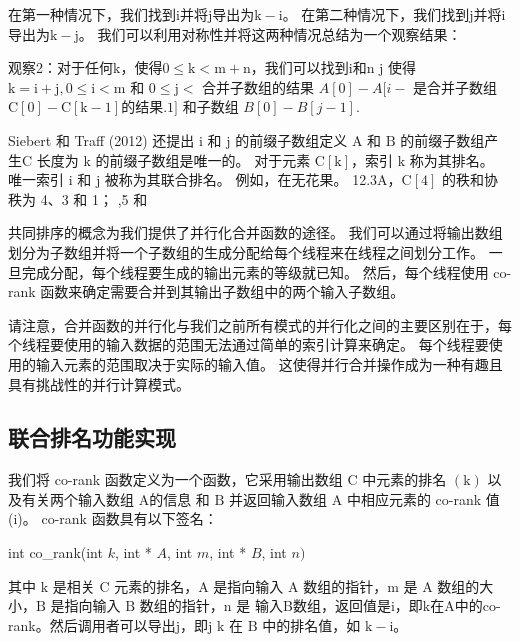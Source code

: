 在第一种情况下，我们找到$\mathrm{i}$并将$\mathrm{j}$导出为$\mathrm{k}-\mathrm{i}$。 在第二种情况下，我们找到$\mathrm{j}$并将$\mathrm{i}$导出为$\mathrm{k}-\mathrm{j}$。 我们可以利用对称性并将这两种情况总结为一个观察结果：

观察2：对于任何$\mathrm{k}$，使得$0 \leq \mathrm{k}<\mathrm{m}+\mathrm{n}$，我们可以找到$\mathrm{i}$和$\mathrm {n}$ {j} 使得 $\mathrm{k}=\mathrm{i}+\mathrm{j}, 0 \leq \mathrm{i}<\mathrm{m}$ 和 $0 \leq \mathrm {j}<$ 合并子数组的结果 $A[0]-A[i-$ 是合并子数组 $\mathrm{C}[0]-\mathrm{C}[\mathrm{k}-1 ]$的结果$.1]$ 和子数组 $B[0]-B[j-1]$.

Siebert 和 Traff (2012) 还提出 $\mathrm{i}$ 和 $\mathrm{j}$ 的前缀子数组定义 $\mathrm{A}$ 和 $\mathrm{B}$ 的前缀子数组产生$\mathrm{C}$ 长度为 $\mathrm{k}$ 的前缀子数组是唯一的。 对于元素 $\mathrm{C}[\mathrm{k}]$，索引 $\mathrm{k}$ 称为其排名。 唯一索引 $\mathrm{i}$ 和 $\mathrm{j}$ 被称为其联合排名。 例如，在无花果。 12.3A，$\mathrm{C}[4]$ 的秩和协秩为 4、3 和 1； ,5 和

共同排序的概念为我们提供了并行化合并函数的途径。 我们可以通过将输出数组划分为子数组并将一个子数组的生成分配给每个线程来在线程之间划分工作。 一旦完成分配，每个线程要生成的输出元素的等级就已知。 然后，每个线程使用 co-rank 函数来确定需要合并到其输出子数组中的两个输入子数组。

请注意，合并函数的并行化与我们之前所有模式的并行化之间的主要区别在于，每个线程要使用的输入数据的范围无法通过简单的索引计算来确定。 每个线程要使用的输入元素的范围取决于实际的输入值。 这使得并行合并操作成为一种有趣且具有挑战性的并行计算模式。

\subsection{联合排名功能实现}
我们将 co-rank 函数定义为一个函数，它采用输出数组 $\mathrm{C}$ 中元素的排名 $(\mathrm{k})$ 以及有关两个输入数组 $\mathrm{A} 的信息 $ 和 $\mathrm{B}$ 并返回输入数组 A 中相应元素的 co-rank 值 (i)。 co-rank 函数具有以下签名：

int co\_rank(int $k$, int * $A$, int $m$, int * $B$, int $n)$

其中 $\mathrm{k}$ 是相关 $\mathrm{C}$ 元素的排名，$\mathrm{A}$ 是指向输入 $\mathrm{A}$ 数组的指针，$\mathrm{ m}$ 是 $\mathrm{A}$ 数组的大小，$\mathrm{B}$ 是指向输入 $\mathrm{B}$ 数组的指针，$\mathrm{n}$ 是 输入B数组，返回值是$\mathrm{i}$，即$\mathrm{k}$在A中的co-rank。然后调用者可以导出$\mathrm{j}$，即$\mathrm{j}$ $\mathrm{k}$ 在 $\mathrm{B}$ 中的排名值，如 $\mathrm{k}-\mathrm{i}$。


